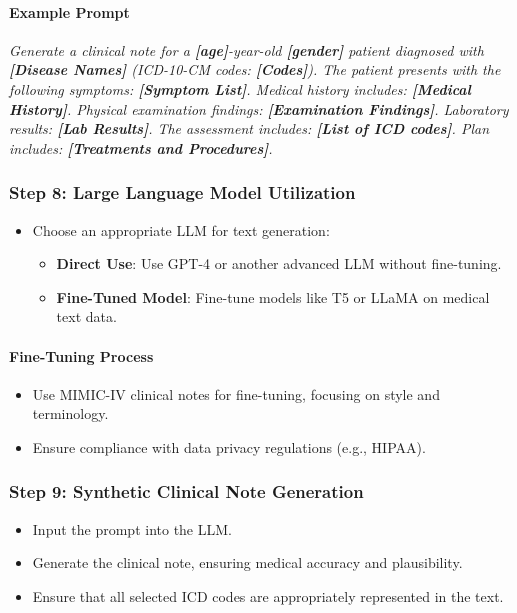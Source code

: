 \documentclass[12pt, a4paper]{article}
\begin{document}
\paragraph{Example Prompt}

\textit{Generate a clinical note for a \textbf{[age]}-year-old \textbf{[gender]} patient diagnosed with \textbf{[Disease Names]} (ICD-10-CM codes: \textbf{[Codes]}). The patient presents with the following symptoms: \textbf{[Symptom List]}. Medical history includes: \textbf{[Medical History]}. Physical examination findings: \textbf{[Examination Findings]}. Laboratory results: \textbf{[Lab Results]}. The assessment includes: \textbf{[List of ICD codes]}. Plan includes: \textbf{[Treatments and Procedures]}.}

\subsubsection{Step 8: Large Language Model Utilization}

\begin{itemize}
    \item Choose an appropriate LLM for text generation:
    \begin{itemize}
        \item \textbf{Direct Use}: Use GPT-4 or another advanced LLM without fine-tuning.
        \item \textbf{Fine-Tuned Model}: Fine-tune models like T5 or LLaMA on medical text data.
    \end{itemize}
\end{itemize}

\paragraph{Fine-Tuning Process}

\begin{itemize}
    \item Use MIMIC-IV clinical notes for fine-tuning, focusing on style and terminology.
    \item Ensure compliance with data privacy regulations (e.g., HIPAA).
\end{itemize}

\subsubsection{Step 9: Synthetic Clinical Note Generation}

\begin{itemize}
    \item Input the prompt into the LLM.
    \item Generate the clinical note, ensuring medical accuracy and plausibility.
    \item Ensure that all selected ICD codes are appropriately represented in the text.
\end{itemize}
\end{document}
